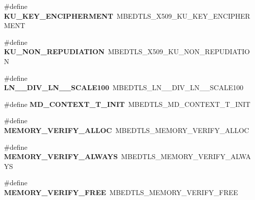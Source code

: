 \begin{DoxyCompactItemize}
\item 
\mbox{\label{compat-1_83_8h_a64f1e2e3dd57557fdad2ca9c07f63ec4}} 
\#define {\bfseries K\+U\+\_\+\+K\+E\+Y\+\_\+\+E\+N\+C\+I\+P\+H\+E\+R\+M\+E\+NT}~M\+B\+E\+D\+T\+L\+S\+\_\+\+X509\+\_\+\+K\+U\+\_\+\+K\+E\+Y\+\_\+\+E\+N\+C\+I\+P\+H\+E\+R\+M\+E\+NT
\item 
\mbox{\label{compat-1_83_8h_aa97f2a6fc340bc3a22004fe7a245a1c6}} 
\#define {\bfseries K\+U\+\_\+\+N\+O\+N\+\_\+\+R\+E\+P\+U\+D\+I\+A\+T\+I\+ON}~M\+B\+E\+D\+T\+L\+S\+\_\+\+X509\+\_\+\+K\+U\+\_\+\+N\+O\+N\+\_\+\+R\+E\+P\+U\+D\+I\+A\+T\+I\+ON
\item 
\mbox{\label{compat-1_83_8h_a97c90562c6192dfc2b8cf38152e1fa4b}} 
\#define {\bfseries L\+N\+\_\+\_\+\+D\+I\+V\+\_\+\+L\+N\+\_\+\_\+\+S\+C\+A\+L\+E100}~M\+B\+E\+D\+T\+L\+S\+\_\+\+L\+N\+\_\+\_\+\+D\+I\+V\+\_\+\+L\+N\+\_\+\_\+\+S\+C\+A\+L\+E100
\item 
\mbox{\label{compat-1_83_8h_a45b0c403a33ff1f73947597785cf5ca7}} 
\#define {\bfseries M\+D\+\_\+\+C\+O\+N\+T\+E\+X\+T\+\_\+\+T\+\_\+\+I\+N\+IT}~M\+B\+E\+D\+T\+L\+S\+\_\+\+M\+D\+\_\+\+C\+O\+N\+T\+E\+X\+T\+\_\+\+T\+\_\+\+I\+N\+IT
\item 
\mbox{\label{compat-1_83_8h_a129f05dbba09d85d2b880faeca2a6eff}} 
\#define {\bfseries M\+E\+M\+O\+R\+Y\+\_\+\+V\+E\+R\+I\+F\+Y\+\_\+\+A\+L\+L\+OC}~M\+B\+E\+D\+T\+L\+S\+\_\+\+M\+E\+M\+O\+R\+Y\+\_\+\+V\+E\+R\+I\+F\+Y\+\_\+\+A\+L\+L\+OC
\item 
\mbox{\label{compat-1_83_8h_a8e4c201d28d750e49911028b8062bb8f}} 
\#define {\bfseries M\+E\+M\+O\+R\+Y\+\_\+\+V\+E\+R\+I\+F\+Y\+\_\+\+A\+L\+W\+A\+YS}~M\+B\+E\+D\+T\+L\+S\+\_\+\+M\+E\+M\+O\+R\+Y\+\_\+\+V\+E\+R\+I\+F\+Y\+\_\+\+A\+L\+W\+A\+YS
\item 
\mbox{\label{compat-1_83_8h_adc781138868927caa03bfe4b58c4e80d}} 
\#define {\bfseries M\+E\+M\+O\+R\+Y\+\_\+\+V\+E\+R\+I\+F\+Y\+\_\+\+F\+R\+EE}~M\+B\+E\+D\+T\+L\+S\+\_\+\+M\+E\+M\+O\+R\+Y\+\_\+\+V\+E\+R\+I\+F\+Y\+\_\+\+F\+R\+EE
\item 
\mbox{\label{compat-1_83_8h_ae9b20acb59b74c83292f835ee94b2b42}} 

\end{DoxyCompactItemize}

